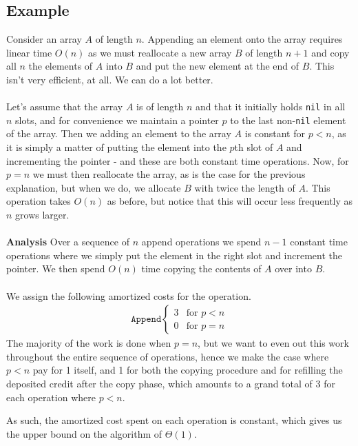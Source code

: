\subsection{Example}
Consider an array $A$ of length $n$. Appending an element onto the array
requires linear time $O(n)$ as we must reallocate a new array $B$ of length
$n+1$ and copy all $n$ the elements of $A$ into $B$ and put the new element
at the end of $B$. This isn't very efficient, at all. We can do a lot better.
\\\\
Let's assume that the array $A$ is of length $n$ and that it initially holds
\texttt{nil} in all $n$ slots, and for convenience we maintain a pointer $p$
to the last non-\texttt{nil} element of the array. Then we adding an element
to the array $A$ is constant for $p < n$, as it is simply a matter of putting
the element into the $p$th slot of $A$ and incrementing the pointer - and
these are both constant time operations. Now, for $p = n$ we must then
reallocate the array, as is the case for the previous explanation, but when
we do, we allocate $B$ with twice the length of $A$. This operation takes
$O(n)$ as before, but notice that this will occur less frequently as $n$ grows
larger.
\\\\
\noindent \textbf{Analysis}
Over a sequence of $n$ append operations we spend $n - 1$ constant time
operations where we simply put the element in the right slot and increment
the pointer. We then spend $O(n)$ time copying the contents of $A$ over into
$B$.
\\\\
\noindent We assign the following amortized costs for the operation.
\begin{align}
	\texttt{Append}
	\begin{cases}
		3 &\mbox{for } p < n \\
		0 &\mbox{for } p = n
	\end{cases}
\end{align}
The majority of the work is done when $p = n$, but we want to even out this
work throughout the entire sequence of operations, hence we make the case
where $p < n$ pay for 1 itself, and 1 for both the copying procedure and for
refilling the deposited credit after the copy phase, which amounts to a grand
total of 3 for each operation where $p < n$.


As such, the amortized cost spent on each operation is constant, which gives
us the upper bound on the algorithm of $\Theta(1)$.

